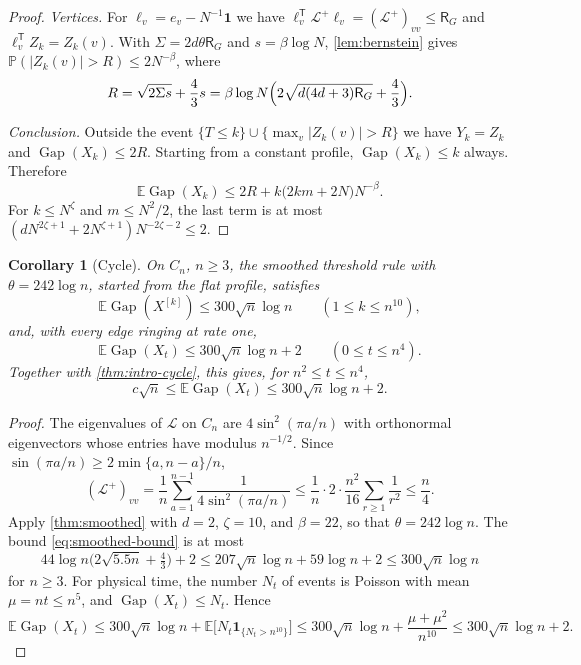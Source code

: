 \documentclass[11pt]{article}
\newtheorem{corollary}[corollary]{Corollary}
\theoremstyle{remark}
\newcommand{\E}{\mathbb{E}}
\newcommand{\Pp}{\mathbb{P}}
\newcommand{\one}{\mathbf{1}}
\newcommand{\Gap}{\operatorname{Gap}}
\begin{document}
\begin{proof}
\emph{Vertices.} For $\ell_v=e_v-N^{-1}\one$ we have $\ell_v^{\mathsf T}\mathcal L^+\ell_v=(\mathcal L^+)_{vv}\le\mathsf R_G$ and $\ell_v^{\mathsf T}Z_k=Z_k(v)$. With $\Sigma=2d\theta\mathsf R_G$ and $s=\beta\log N$, \cref{lem:bernstein} gives $\Pp(|Z_k(v)|>R)\le2N^{-\beta}$, where
\[
 R=\sqrt{2\Sigma s}+\frac43s=\beta\log N\Bigl(2\sqrt{d(4d+3)\mathsf R_G}+\frac43\Bigr).
\]

\emph{Conclusion.} Outside the event $\{T\le k\}\cup\{\max_v|Z_k(v)|>R\}$ we have $Y_k=Z_k$ and $\Gap(X_k)\le2R$. Starting from a constant profile, $\Gap(X_k)\le k$ always. Therefore
\[
 \E\Gap(X_k)\le2R+k\bigl(2km+2N\bigr)N^{-\beta}.
\]
For $k\le N^\zeta$ and $m\le N^2/2$, the last term is at most $(dN^{2\zeta+1}+2N^{\zeta+1})N^{-2\zeta-2}\le2$.
\end{proof}

\begin{corollary}[Cycle]\label{cor:smoothed-cycle}
On $C_n$, $n\ge3$, the smoothed threshold rule with $\theta=242\log n$, started from the flat profile, satisfies
\[
 \E\Gap(X^{[k]})\le300\sqrt n\log n\qquad(1\le k\le n^{10}),
\]
and, with every edge ringing at rate one,
\[
 \E\Gap(X_t)\le300\sqrt n\log n+2\qquad(0\le t\le n^4).
\]
Together with \cref{thm:intro-cycle}, this gives, for $n^2\le t\le n^4$,
\[
 c\sqrt n\le\E\Gap(X_t)\le300\sqrt n\log n+2.
\]
\end{corollary}

\begin{proof}
The eigenvalues of $\mathcal L$ on $C_n$ are $4\sin^2(\pi a/n)$ with orthonormal eigenvectors whose entries have modulus $n^{-1/2}$. Since $\sin(\pi a/n)\ge2\min\{a,n-a\}/n$,
\[
 (\mathcal L^+)_{vv}=\frac1n\sum_{a=1}^{n-1}\frac1{4\sin^2(\pi a/n)}
 \le\frac1n\cdot2\cdot\frac{n^2}{16}\sum_{r\ge1}\frac1{r^2}\le\frac n4.
\]
Apply \cref{thm:smoothed} with $d=2$, $\zeta=10$, and $\beta=22$, so that $\theta=242\log n$. The bound \eqref{eq:smoothed-bound} is at most
\[
 44\log n\bigl(2\sqrt{5.5n}+\tfrac43\bigr)+2\le207\sqrt n\log n+59\log n+2\le300\sqrt n\log n
\]
for $n\ge3$. For physical time, the number $N_t$ of events is Poisson with mean $\mu=nt\le n^5$, and $\Gap(X_t)\le N_t$. Hence
\[
 \E\Gap(X_t)\le300\sqrt n\log n+\E\bigl[N_t\one_{\{N_t>n^{10}\}}\bigr]
 \le300\sqrt n\log n+\frac{\mu+\mu^2}{n^{10}}\le300\sqrt n\log n+2.
\]
\end{proof}
\end{document}
